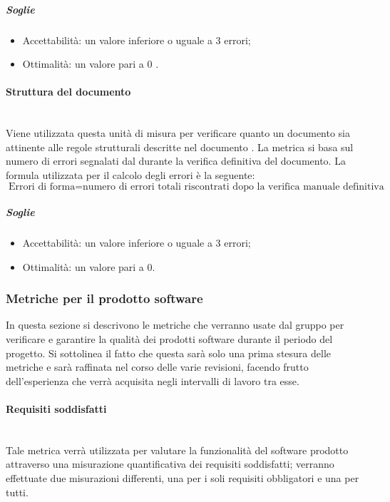 \subparagraph{Soglie}
\begin{itemize}
\item Accettabilità: un valore inferiore o uguale a 3 errori;
\item Ottimalità: un valore pari a 0 .
\end{itemize}

\paragraph{Struttura del documento}
\label{AppB:ErroriForma}
	~\\Viene utilizzata questa unità di misura per verificare quanto un documento sia attinente alle regole strutturali descritte nel documento \NdP{}.
La metrica si basa sul numero di errori segnalati dal \ver{} durante la verifica definitiva del documento.
\newline La formula utilizzata per il calcolo degli errori è la seguente:
\begin{displaymath}
\mbox{Errori di forma}={\mbox{numero di errori totali riscontrati dopo la verifica manuale definitiva}}
\end{displaymath}

\subparagraph{Soglie}
\begin{itemize}
\item Accettabilità: un valore inferiore o uguale a 3 errori;
\item Ottimalità: un valore pari a 0.
\end{itemize}

\subsubsection{Metriche per il prodotto software}
\label{AppB:metricheSoft}
In questa sezione si descrivono le metriche che verranno usate dal gruppo per verificare e garantire la qualità dei prodotti software durante il periodo del progetto. Si sottolinea il fatto che questa sarà solo una prima stesura delle metriche e sarà raffinata nel corso delle varie revisioni, facendo frutto dell'esperienza che verrà acquisita negli intervalli di lavoro tra esse.

\paragraph{Requisiti soddisfatti}
\label{AppB:Funzionalita}
	~\\Tale metrica verrà utilizzata per valutare la funzionalità del software prodotto attraverso una misurazione quantificativa dei requisiti soddisfatti; verranno effettuate due misurazioni differenti, una per i soli requisiti obbligatori e una per tutti.

